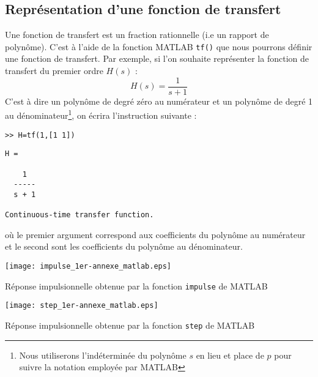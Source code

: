 \subsection{Représentation d'une fonction de transfert}
Une fonction de transfert est un fraction rationnelle 
(i.e un rapport de polynôme). C'est à l'aide de la fonction MATLAB \texttt{tf()}
que nous pourrons définir une fonction de transfert. Par exemple, si 
l'on souhaite représenter la fonction de transfert du premier ordre $H(s)$ :
\[
    H(s) = \dfrac{1}{s+1}
\]
C'est à dire un polynôme de degré zéro au numérateur et un polynôme de 
degré 1 au dénominateur\footnote{Nous utiliserons l'indéterminée du polynôme $s$ 
en lieu et place de $p$ pour suivre la notation employée par MATLAB}, on écrira
l'instruction suivante :
\begin{verbatim}
>> H=tf(1,[1 1]) 
\end{verbatim}
\begin{verbatim}
H =
 
    1
  -----
  s + 1
 
Continuous-time transfer function.
\end{verbatim}
où le premier argument correspond aux coefficients du polynôme au numérateur 
et le second sont les coefficients du polynôme au dénominateur. 
\begin{marginfigure}
    \centering
    \texttt{[image: impulse\_1er-annexe\_matlab.eps]}
    \caption{Réponse impulsionnelle obtenue par la fonction \texttt{impulse} de MATLAB}
\end{marginfigure}
\begin{marginfigure}
    \centering
    \texttt{[image: step\_1er-annexe\_matlab.eps]}
    \caption{Réponse impulsionnelle obtenue par la fonction \texttt{step} de MATLAB}
\end{marginfigure}
